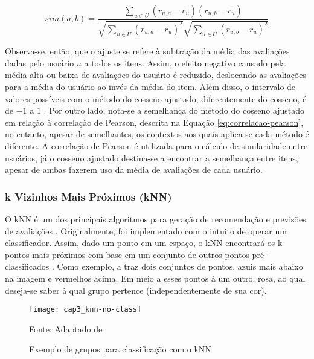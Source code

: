         \begin{equation}
             sim(a, b) = \frac{\sum_{u\in U}(r_{u, a}-\overline{r_u})(r_{u, b}-\overline{r_u})}{\sqrt{\sum_{u\in U}(r_{u, a}-\overline{r_u})^2}\sqrt{\sum_{u\in U}(r_{u, b}-\overline{r_u})^2}} \label{eq:sim-cosseno-ajustado}
        \end{equation}
        
        Observa-se, então, que o ajuste se refere à subtração da média das avaliações dadas pelo usuário $u$ a todos os itens. Assim, o efeito negativo causado pela média alta ou baixa de avaliações do usuário é reduzido, deslocando as avaliações para a média do usuário ao invés da média do item. Além disso, o intervalo de valores possíveis com o método do cosseno ajustado, diferentemente do cosseno, é de $-1$ a $1$ \cite{Jannach2010, Ricci2010}. Por outro lado, nota-se a semelhança do método do cosseno ajustado em relação à correlação de Pearson, descrita na Equação \ref{eq:correlacao-pearson}, no entanto, apesar de semelhantes, os contextos aos quais aplica-se cada método é diferente. A correlação de Pearson é utilizada para o cálculo de similaridade entre usuários, já o cosseno ajustado destina-se a encontrar a semelhança entre itens, apesar de ambas fazerem uso da média de avaliações de cada usuário.
        
        \subsubsection{k Vizinhos Mais Próximos (kNN)}
            
            O kNN é um dos principais algoritmos para geração de recomendação e previsões de avaliações \cite{Bobadilla_2013}. Originalmente, foi implementado com o intuito de operar um classificador. Assim, dado um ponto em um espaço, o kNN encontrará os k pontos mais próximos com base em um conjunto de outros pontos pré-classificados . Como exemplo, a  traz dois conjuntos de pontos, azuis mais abaixo na imagem e vermelhos acima. Em meio a esses pontos à um outro, rosa, ao qual deseja-se saber à qual grupo pertence (independentemente de sua cor).             
            
            \begin{figure}[htb]
                \caption{Exemplo de grupos para classificação com o kNN}
                \texttt{[image: cap3\_knn-no-class]}
                \label{fig:cap3_knn-no-class}
                
                {\footnotesize Fonte: Adaptado de }
            \end{figure}
                        

